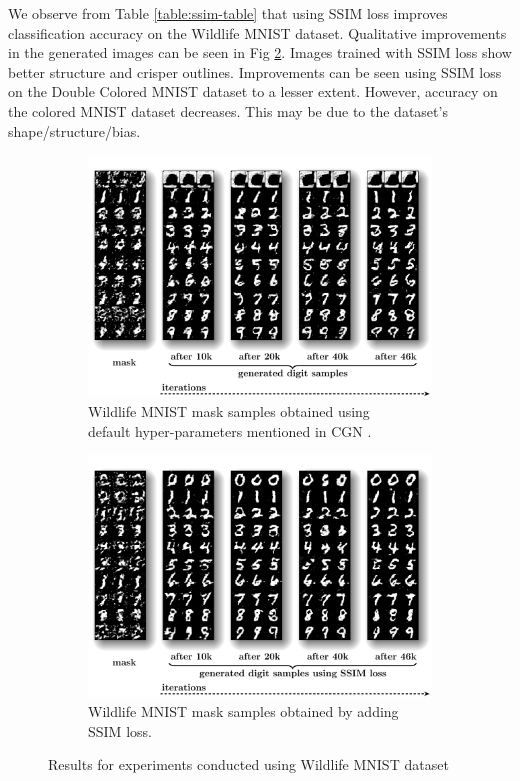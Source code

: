 We observe from Table \ref{table:ssim-table} that using SSIM \citep{wang2004image} loss improves classification accuracy on the Wildlife MNIST dataset. Qualitative improvements in the generated images can be seen in Fig \ref{fig:ssim_grid_mask}. Images trained with SSIM \citep{wang2004image} loss show better structure and crisper outlines. Improvements can be seen using SSIM \citep{wang2004image} loss on the  Double Colored MNIST dataset to a lesser extent. However, accuracy on the colored MNIST dataset decreases. This may be due to the dataset's shape/structure/bias.

\begin{figure}[ht]
    \centering
    \begin{subfigure}{0.5\textwidth}
      \centering
      \includegraphics[width=0.9\linewidth]{../openreview/images/mask_original.pdf}
      \caption{Wildlife MNIST mask samples obtained using \\default hyper-parameters mentioned in CGN \citep{sauer2021counterfactual}.
      }
      \label{fig:original_grid_mask1}
    \end{subfigure}%
    \begin{subfigure}{0.5\textwidth}
      \centering
      \includegraphics[width=0.9\linewidth]{../openreview/images/mask_ssim.pdf}
      \caption{Wildlife MNIST mask samples obtained by adding SSIM \citep{wang2004image} loss.
      }
      \label{fig:ssim_grid_mask}
    \end{subfigure}
    \caption{Results for experiments conducted using Wildlife MNIST dataset}
    \label{fig:demographic_1}
\end{figure}

